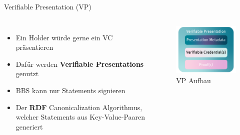 \documentclass[
	german,%
	authorontitle=true,
	]{bfhbeamer}
\begin{document}
\begin{frame}{Verifiable Presentation (VP)}
    \begin{columns}[onlytextwidth,T]
        \column{70mm}  
        \begin{itemize}
            \item Ein Holder würde gerne ein VC präsentieren
            \item Dafür werden \textbf{Verifiable Presentations} genutzt
            \item BBS kann nur Statements signieren
            \item Der \textbf{RDF} Canonicalization Algorithmus, welcher Statements aus Key-Value-Paaren generiert
        \end{itemize}

        \column{70mm}

        \begin{figure}
            \centering
            \includegraphics[width=70mm]{../img/VP.png}
            \caption{VP Aufbau}
        \end{figure}

    \end{columns}
\end{frame}
\end{document}
